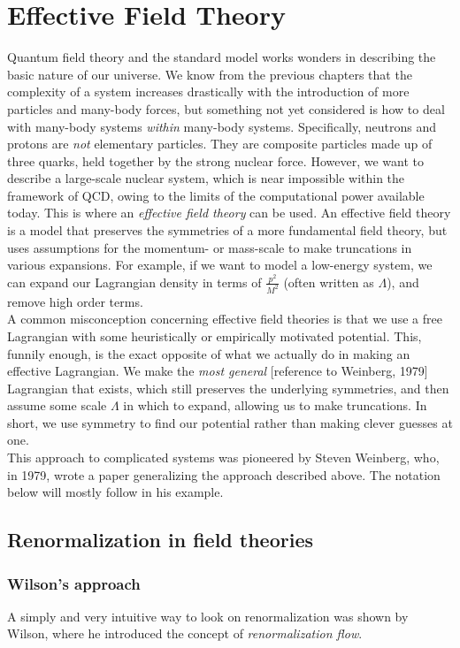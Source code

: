 \documentclass[10pt]{report}
\begin{document}
	\newpage
	\chapter{Effective Field Theory}
	Quantum field theory and the standard model works wonders in describing the basic nature of our universe. We know from the previous chapters that the complexity of a system increases drastically with the introduction of more particles and many-body forces, but something not yet considered is how to deal with many-body systems \emph{within} many-body systems. Specifically, neutrons and protons are \emph{not} elementary particles. They are composite particles made up of three quarks, held together by the strong nuclear force. However, we want to describe a large-scale nuclear system, which is near impossible within the framework of QCD, owing to the limits of the computational power available today. This is where an \emph{effective field theory} can be used. An effective field theory is a model that preserves the symmetries of a more fundamental field theory, but uses assumptions for the momentum- or mass-scale to make truncations in various expansions. For example, if we want to model a low-energy system, we can expand our Lagrangian density in terms of $\frac{p^2}{M^2}$ (often written as $\Lambda$), and remove high order terms.\\
	A common misconception concerning effective field theories is that we use a free Lagrangian with some heuristically or empirically motivated potential. This, funnily enough, is the exact opposite of what we actually do in making an effective Lagrangian. We make the \emph{most general} [reference to Weinberg, 1979] Lagrangian that exists, which still preserves the underlying symmetries, and then assume some scale $\Lambda$ in which to expand, allowing us to make truncations. In short, we use symmetry to find our potential rather than making clever guesses at one.\\
	This approach to complicated systems was pioneered by Steven Weinberg, who, in 1979, wrote a paper generalizing the approach described above. The notation below will mostly follow in his example.\\
	
	\section{Renormalization in field theories}
	
	\subsection{Wilson's approach}
	A simply and very intuitive way to look on renormalization was shown by Wilson, where he introduced the concept of \emph{renormalization flow}.\\
	
\end{document}
